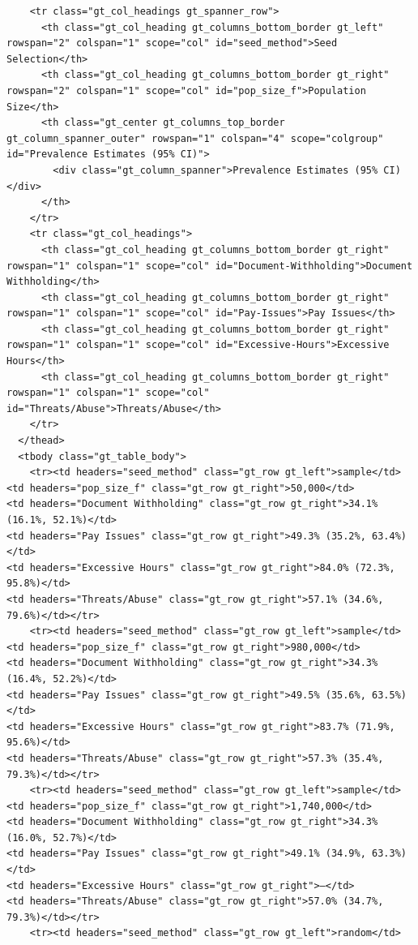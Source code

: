 \documentclass[
  12pt,
  letterpaper,
  DIV=11,
  numbers=noendperiod]{scrartcl}
\theoremstyle{plain}
\theoremstyle{definition}
\begin{document}
\begin{table}
{\begin{verbatim}
    <tr class="gt_col_headings gt_spanner_row">
      <th class="gt_col_heading gt_columns_bottom_border gt_left" rowspan="2" colspan="1" scope="col" id="seed_method">Seed Selection</th>
      <th class="gt_col_heading gt_columns_bottom_border gt_right" rowspan="2" colspan="1" scope="col" id="pop_size_f">Population Size</th>
      <th class="gt_center gt_columns_top_border gt_column_spanner_outer" rowspan="1" colspan="4" scope="colgroup" id="Prevalence Estimates (95% CI)">
        <div class="gt_column_spanner">Prevalence Estimates (95% CI)</div>
      </th>
    </tr>
    <tr class="gt_col_headings">
      <th class="gt_col_heading gt_columns_bottom_border gt_right" rowspan="1" colspan="1" scope="col" id="Document-Withholding">Document Withholding</th>
      <th class="gt_col_heading gt_columns_bottom_border gt_right" rowspan="1" colspan="1" scope="col" id="Pay-Issues">Pay Issues</th>
      <th class="gt_col_heading gt_columns_bottom_border gt_right" rowspan="1" colspan="1" scope="col" id="Excessive-Hours">Excessive Hours</th>
      <th class="gt_col_heading gt_columns_bottom_border gt_right" rowspan="1" colspan="1" scope="col" id="Threats/Abuse">Threats/Abuse</th>
    </tr>
  </thead>
  <tbody class="gt_table_body">
    <tr><td headers="seed_method" class="gt_row gt_left">sample</td>
<td headers="pop_size_f" class="gt_row gt_right">50,000</td>
<td headers="Document Withholding" class="gt_row gt_right">34.1% (16.1%, 52.1%)</td>
<td headers="Pay Issues" class="gt_row gt_right">49.3% (35.2%, 63.4%)</td>
<td headers="Excessive Hours" class="gt_row gt_right">84.0% (72.3%, 95.8%)</td>
<td headers="Threats/Abuse" class="gt_row gt_right">57.1% (34.6%, 79.6%)</td></tr>
    <tr><td headers="seed_method" class="gt_row gt_left">sample</td>
<td headers="pop_size_f" class="gt_row gt_right">980,000</td>
<td headers="Document Withholding" class="gt_row gt_right">34.3% (16.4%, 52.2%)</td>
<td headers="Pay Issues" class="gt_row gt_right">49.5% (35.6%, 63.5%)</td>
<td headers="Excessive Hours" class="gt_row gt_right">83.7% (71.9%, 95.6%)</td>
<td headers="Threats/Abuse" class="gt_row gt_right">57.3% (35.4%, 79.3%)</td></tr>
    <tr><td headers="seed_method" class="gt_row gt_left">sample</td>
<td headers="pop_size_f" class="gt_row gt_right">1,740,000</td>
<td headers="Document Withholding" class="gt_row gt_right">34.3% (16.0%, 52.7%)</td>
<td headers="Pay Issues" class="gt_row gt_right">49.1% (34.9%, 63.3%)</td>
<td headers="Excessive Hours" class="gt_row gt_right">—</td>
<td headers="Threats/Abuse" class="gt_row gt_right">57.0% (34.7%, 79.3%)</td></tr>
    <tr><td headers="seed_method" class="gt_row gt_left">random</td>

\end{verbatim}}
\end{table}
\end{document}
